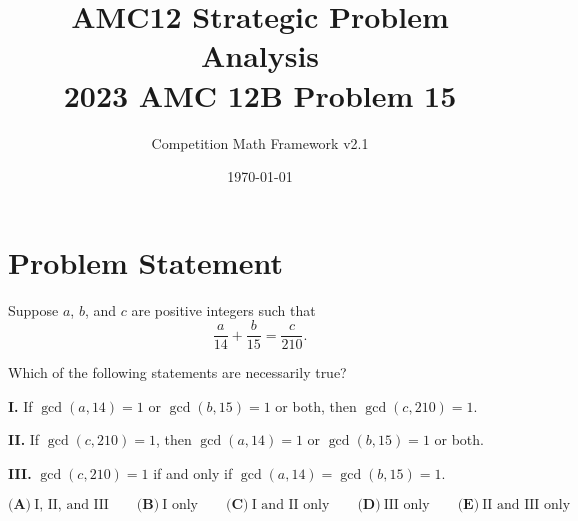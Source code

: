 \documentclass[12pt]{article}
\begin{document}
\title{AMC12 Strategic Problem Analysis\\2023 AMC 12B Problem 15}
\author{Competition Math Framework v2.1}
\date{\today}
\maketitle

\section*{Problem Statement}

Suppose $a$, $b$, and $c$ are positive integers such that
$$\frac{a}{14}+\frac{b}{15}=\frac{c}{210}.$$

Which of the following statements are necessarily true?

\textbf{I.} If $\gcd(a,14)=1$ or $\gcd(b,15)=1$ or both, then $\gcd(c,210)=1$.

\textbf{II.} If $\gcd(c,210)=1$, then $\gcd(a,14)=1$ or $\gcd(b,15)=1$ or both.

\textbf{III.} $\gcd(c,210)=1$ if and only if $\gcd(a,14)=\gcd(b,15)=1$.

$$\textbf{(A)}~\text{I, II, and III}\qquad\textbf{(B)}~\text{I only}\qquad\textbf{(C)}~\text{I and II only}\qquad\textbf{(D)}~\text{III only}\qquad\textbf{(E)}~\text{II and III only}$$
\end{document}
